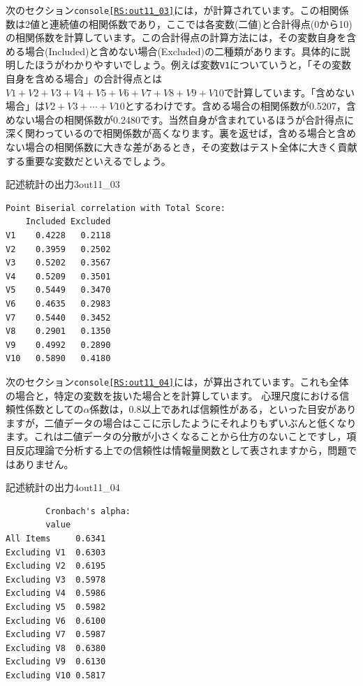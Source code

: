 \documentclass{ltjsbook}
\begin{document}
次のセクション\texttt{console\ref{RS:out11_03}}には，が計算されています。この相関係数は2値と連続値の相関係数であり，ここでは各変数(二値)と合計得点(0から10)の相関係数を計算しています。この合計得点の計算方法には，その変数自身を含める場合(Included)と含めない場合(Excluded)の二種類があります。具体的に説明したほうがわかりやすいでしょう。例えば変数\texttt{V1}についていうと，「その変数自身を含める場合」の合計得点とは$V1+V2+V3+V4+V5+V6+V7+V8+V9+V10$で計算しています。「含めない場合」は$V2+V3+\cdots+V10$とするわけです。含める場合の相関係数が0.5207，含めない場合の相関係数が0.2480です。当然自身が含まれているほうが合計得点に深く関わっているので相関係数が高くなります。裏を返せば，含める場合と含めない場合の相関係数に大きな差があるとき，その変数はテスト全体に大きく貢献する重要な変数だといえるでしょう。
\begin{Rscreen}{記述統計の出力3}{out11_03}
    \begin{verbatim}
Point Biserial correlation with Total Score:
    Included Excluded
V1    0.4228   0.2118
V2    0.3959   0.2502
V3    0.5202   0.3567
V4    0.5209   0.3501
V5    0.5449   0.3470
V6    0.4635   0.2983
V7    0.5440   0.3452
V8    0.2901   0.1350
V9    0.4992   0.2890
V10   0.5890   0.4180
    \end{verbatim}
\end{Rscreen}

次のセクション\texttt{console\ref{RS:out11_04}}には，が算出されています。これも全体の場合と，特定の変数を抜いた場合とを計算しています。
心理尺度における信頼性係数としての$\alpha$係数は，0.8以上であれば信頼性がある，といった目安がありますが，二値データの場合はここに示したようにそれよりもずいぶんと低くなります。これは二値データの分散が小さくなることから仕方のないことですし，項目反応理論で分析する上での信頼性は情報量関数として表されますから，問題ではありません。
\begin{Rscreen}{記述統計の出力4}{out11_04}
    \begin{verbatim}
        Cronbach's alpha:
        value
All Items     0.6341
Excluding V1  0.6303
Excluding V2  0.6195
Excluding V3  0.5978
Excluding V4  0.5986
Excluding V5  0.5982
Excluding V6  0.6100
Excluding V7  0.5987
Excluding V8  0.6380
Excluding V9  0.6130
Excluding V10 0.5817
    \end{verbatim}
\end{Rscreen}
\end{document}
